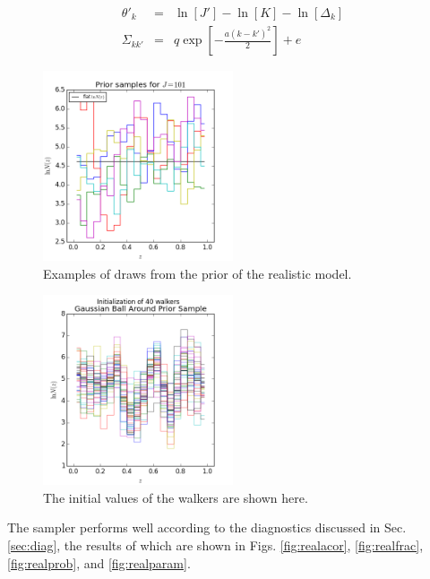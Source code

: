 \documentclass[preprint]{aastex}
\begin{document}
\begin{eqnarray}
\label{eq:covmat}
\theta'_{k} &=& \ln[J']-\ln[K]-\ln[\Delta_{k}]\\
\Sigma_{kk'} &=& q\exp\left[-\frac{a(k-k')^{2}}{2}\right]+e
\end{eqnarray}

\begin{figure}
\includegraphics[width=0.5\textwidth]{null/priorsamps.png}
\caption{Examples of draws from the prior of the realistic model.}
\label{fig:realprior}
\end{figure}

\begin{figure}
\includegraphics[width=0.5\textwidth]{null/initializations.png}
\caption{The initial values of the walkers are shown here.}
\label{fig:realival}
\end{figure}

The sampler performs well according to the diagnostics discussed in Sec. \ref{sec:diag}, the results of which are shown in Figs. \ref{fig:realacor}, \ref{fig:realfrac}, \ref{fig:realprob}, and \ref{fig:realparam}.  
\end{document}
